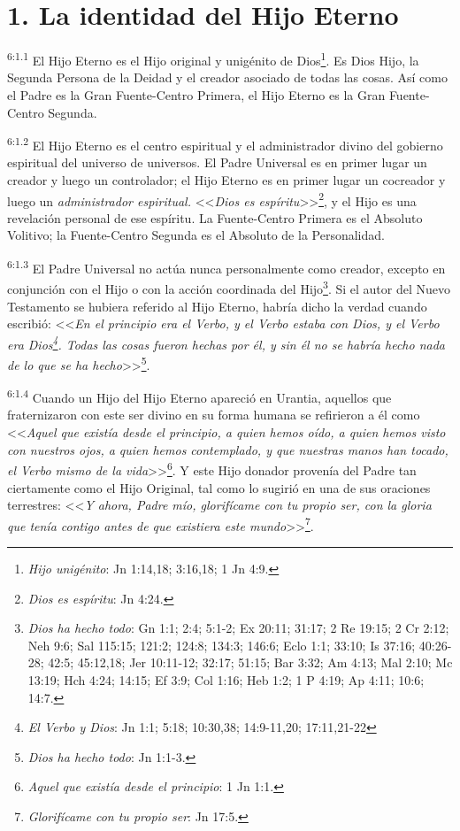 \section*{1. La identidad del Hijo Eterno}
\par
\textsuperscript{6:1.1} El Hijo Eterno es el Hijo original y unigénito de Dios\footnote{\textit{Hijo unigénito}: Jn 1:14,18; 3:16,18; 1 Jn 4:9.}. Es Dios Hijo, la Segunda Persona de la Deidad y el creador asociado de todas las cosas. Así como el Padre es la Gran Fuente-Centro Primera, el Hijo Eterno es la Gran Fuente-Centro Segunda.

\par
\textsuperscript{6:1.2} El Hijo Eterno es el centro espiritual y el administrador divino del gobierno espiritual del universo de universos. El Padre Universal es en primer lugar un creador y luego un controlador; el Hijo Eterno es en primer lugar un cocreador y luego un \textit{administrador espiritual.} <<\textit{Dios es espíritu}>>\footnote{\textit{Dios es espíritu}: Jn 4:24.}, y el Hijo es una revelación personal de ese espíritu. La Fuente-Centro Primera es el Absoluto Volitivo; la Fuente-Centro Segunda es el Absoluto de la Personalidad.

\par
\textsuperscript{6:1.3} El Padre Universal no actúa nunca personalmente como creador, excepto en conjunción con el Hijo o con la acción coordinada del Hijo\footnote{\textit{Dios ha hecho todo}: Gn 1:1; 2:4; 5:1-2; Ex 20:11; 31:17; 2 Re 19:15; 2 Cr 2:12; Neh 9:6; Sal 115:15; 121:2; 124:8; 134:3; 146:6; Eclo 1:1; 33:10; Is 37:16; 40:26-28; 42:5; 45:12,18; Jer 10:11-12; 32:17; 51:15; Bar 3:32; Am 4:13; Mal 2:10; Mc 13:19; Hch 4:24; 14:15; Ef 3:9; Col 1:16; Heb 1:2; 1 P 4:19; Ap 4:11; 10:6; 14:7.}. Si el autor del Nuevo Testamento se hubiera referido al Hijo Eterno, habría dicho la verdad cuando escribió: <<\textit{En el principio era el Verbo, y el Verbo estaba con Dios, y el Verbo era Dios\footnote{\textit{El Verbo y Dios}: Jn 1:1; 5:18; 10:30,38; 14:9-11,20; 17:11,21-22}. Todas las cosas fueron hechas por él, y sin él no se habría hecho nada de lo que se ha hecho}>>\footnote{\textit{Dios ha hecho todo}: Jn 1:1-3.}.

\par
\textsuperscript{6:1.4} Cuando un Hijo del Hijo Eterno apareció en Urantia, aquellos que fraternizaron con este ser divino en su forma humana se refirieron a él como <<\textit{Aquel que existía desde el principio, a quien hemos oído, a quien hemos visto con nuestros ojos, a quien hemos contemplado, y que nuestras manos han tocado, el Verbo mismo de la vida}>>\footnote{\textit{Aquel que existía desde el principio}: 1 Jn 1:1.}. Y este Hijo donador provenía del Padre tan ciertamente como el Hijo Original, tal como lo sugirió en una de sus oraciones terrestres: <<\textit{Y ahora, Padre mío, glorifícame con tu propio ser, con la gloria que tenía contigo antes de que existiera este mundo}>>\footnote{\textit{Glorifícame con tu propio ser}: Jn 17:5.}.

